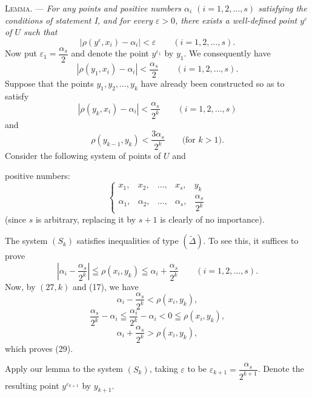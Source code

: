 \documentclass[a4paper,12pt]{amsart}
\newcommand{\srcpage}[1]{} %
\begin{document}
\textsc{Lemma.} --- \textit{For any points and positive numbers $\alpha_i$ $(i=1,2,\dots,s)$ satisfying the conditions of statement I, and for every $\varepsilon>0$, there exists a well-defined point $y^\varepsilon$ of $U$ such that}
\begin{equation}\tag{26}
|\rho(y^\varepsilon,x_i)-\alpha_i|<\varepsilon\qquad(i=1,2,\dots,s).
\end{equation}
Now put $\varepsilon_1=\dfrac{\alpha_s}{2}$ and denote the point $y^{\varepsilon_1}$ by $y_1$. We consequently have
\begin{equation}\tag{27, 1}
|\rho(y_1,x_i)-\alpha_i|<\frac{\alpha_s}{2}\qquad(i=1,2,\dots,s).
\end{equation}
Suppose that the points $y_1,y_2,\dots,y_k$ have already been constructed so as to satisfy
\begin{equation}\tag{27, $k$}
|\rho(y_k,x_i)-\alpha_i|<\frac{\alpha_s}{2^k}\qquad(i=1,2,\dots,s)
\end{equation}
and
\begin{equation}\tag{28, $k$}
\rho(y_{k-1},y_k)<\frac{3\alpha_s}{2^k}\qquad\text{(for $k>1$).}
\end{equation}
Consider the following system of points of $U$ and
\srcpage{62}
positive numbers:
\begin{equation}\tag{$S_k$}
\left\{\begin{array}{ccccc}
x_1,&x_2,&\dots,&x_s,&y_k\\[4pt]
\alpha_1,&\alpha_2,&\dots,&\alpha_s,&\dfrac{\alpha_s}{2^k}
\end{array}\right.
\end{equation}
(since $s$ is arbitrary, replacing it by $s+1$ is clearly of no importance).

The system $(S_k)$ satisfies inequalities of type $(\widetilde{\Delta})$. To see this, it suffices to prove
\begin{equation}\tag{29}
\left|\alpha_i-\frac{\alpha_s}{2^k}\right|\leqq\rho(x_i,y_k)
\leqq\alpha_i+\frac{\alpha_s}{2^k}\qquad(i=1,2,\dots,s).
\end{equation}
Now, by $(27,k)$ and (17), we have
\[
\alpha_i-\frac{\alpha_s}{2^k}<\rho(x_i,y_k),
\]
\[
\frac{\alpha_s}{2^k}-\alpha_i\leqq\frac{\alpha_i}{2^k}-\alpha_i<0\leqq\rho(x_i,y_k),
\]
\[
\alpha_i+\frac{\alpha_s}{2^k}>\rho(x_i,y_k),
\]
which proves (29).

Apply our lemma to the system $(S_k)$, taking $\varepsilon$ to be $\varepsilon_{k+1}=\dfrac{\alpha_s}{2^{k+1}}$. Denote the resulting point $y^{\varepsilon_{k+1}}$ by $y_{k+1}$.
\end{document}
